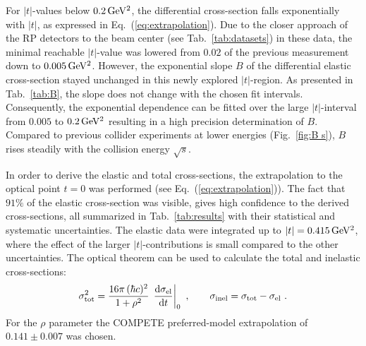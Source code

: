 \documentclass[doublecol]{epl/epl2}
\def\d{{\rm d}}
\def\un#1{\,{\rm #1}}
\begin{document}
For $|t|$-values below $0.2\un{GeV^2}$, the differential cross-section falls exponentially with $|t|$, as expressed in Eq.~(\ref{eq:extrapolation}). Due to the closer approach of the RP detectors to the beam center (see Tab.~\ref{tab:datasets}) in these data, the minimal reachable $|t|$-value was lowered from $0.02$ of the previous measurement \cite{epl96} down to $0.005\un{GeV^2}$. However, the exponential slope $B$ of the differential elastic cross-section stayed unchanged in this newly explored $|t|$-region. As presented in Tab.~\ref{tab:B}, the slope does not change with the chosen fit intervals. Consequently, the exponential dependence can be fitted over the large $|t|$-interval from $0.005$ to $0.2\un{GeV^2}$ resulting in a high precision determination of $B$. Compared to previous collider experiments at lower energies (Fig.~\ref{fig:B s}), $B$ rises steadily with the collision energy $\sqrt s$.

In order to derive the elastic and total cross-sections, the extrapolation to the optical point $t=0$ was performed (see Eq.~(\ref{eq:extrapolation})). The fact that $91\%$ of the elastic cross-section was visible, gives high confidence to the derived cross-sections, all summarized in Tab.~\ref{tab:results} with their statistical and systematic uncertainties. The elastic data were integrated up to $|t| = 0.415\un{GeV^2}$, where the effect of the larger $|t|$-contributions is small compared to the other uncertainties. The optical theorem can be used to calculate the total and inelastic cross-sections:
\begin{equation}
\label{eq:si tot}
\sigma_{\rm tot}^2 = {16\pi\, (\hbar c)^2\over 1 + \rho^2}\, \left. \d\sigma_{\rm el}\over\d t\right|_0\ ,\qquad
\sigma_{\rm inel} = \sigma_{\rm tot} - \sigma_{\rm el}\ .
\end{equation}
For the $\rho$ parameter the COMPETE \cite{compete} preferred-model extrapolation of $0.141\pm 0.007$ was chosen.





\end{document}

